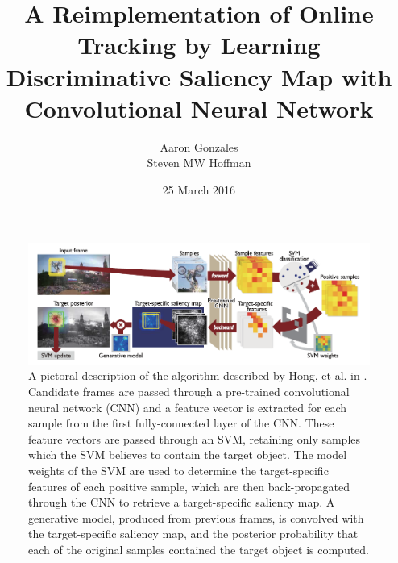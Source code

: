 \documentclass{sig-alternate-05-2015}
\begin{document}


\title{A Reimplementation of Online Tracking by Learning Discriminative Saliency Map with Convolutional Neural Network}

\author{
%
%
\alignauthor
Aaron Gonzales\\
\alignauthor
Steven MW Hoffman \\
}
\date{25 March 2016}

\maketitle

\begin{figure}[t]
\centering
\includegraphics[width=\textwidth]{algorithm}
\caption{A pictoral description of the algorithm described by Hong, et al. in \cite{hong2015online}. Candidate frames are passed through a pre-trained convolutional neural network (CNN) and a feature vector is extracted for each sample from the first fully-connected layer of the CNN. These feature vectors are passed through an SVM, retaining only samples which the SVM believes to contain the target object. The model weights of the SVM are used to determine the target-specific features of each positive sample, which are then back-propagated through the CNN to retrieve a target-specific saliency map. A generative model, produced from previous frames, is convolved with the target-specific saliency map, and the posterior probability that each of the original samples contained the target object is computed.}
\label{fig:algor}
\end{figure}
\end{document}
